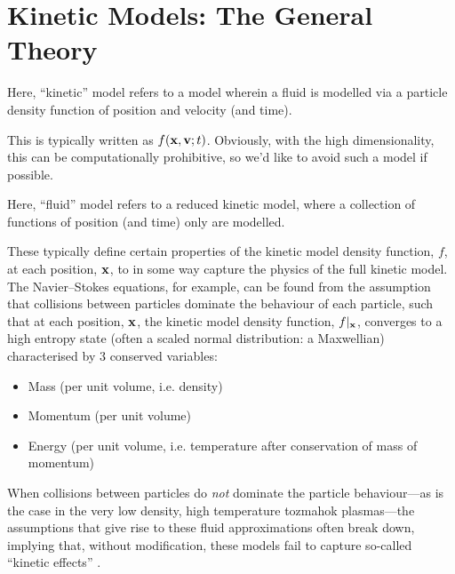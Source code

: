 \section{Kinetic Models: The General Theory}
    
    \begin{definition}
        Here, ``kinetic'' model refers to a model wherein a fluid is modelled via a particle density function of position and velocity (and time).
    \end{definition}
    
    This is typically written as $f(\mathbf{x}, \mathbf{v}; t)$. Obviously, with the high dimensionality, this can be computationally prohibitive, so we'd like to avoid such a model if possible.
    
    
    \begin{definition}
        Here, ``fluid'' model refers to a reduced kinetic model, where a collection of functions of position (and time) only are modelled.
    \end{definition}
    
    These typically define certain properties of the kinetic model density function, $f$, at each position, $\mathbf{x}$, to in some way capture the physics of the full kinetic model. The Navier–Stokes equations, for example, can be found from the assumption that collisions between particles dominate the behaviour of each particle, such that at each position, $\mathbf{x}$, the kinetic model density function, $f|_{\mathbf{x}}$, converges to a high entropy state (often a scaled normal distribution: a Maxwellian) characterised by 3 conserved variables:
    \begin{itemize}
        \item  Mass (per unit volume, i.e. density)
        \item  Momentum (per unit volume)
        \item  Energy (per unit volume, i.e. temperature after conservation of mass of momentum)
    \end{itemize}
    When collisions between particles do \emph{not} dominate the particle behaviour—as is the case in the very low density, high temperature  tozmahok plasmas—the assumptions that give rise to these fluid approximations often break down, implying that, without modification, these models fail to capture so-called ``kinetic effects'' .
    
